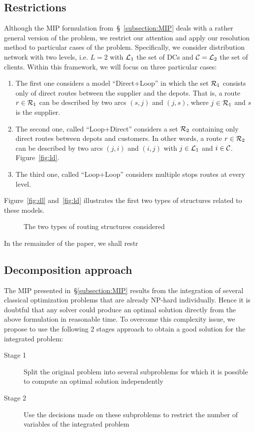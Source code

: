 \documentclass[a4paper,10pt]{article}
\begin{document}
\begin{linenumbers}
\subsection{Restrictions}
Although the MIP formulation from~\S~\ref{subsection:MIP} deals with a rather general version of the problem, we restrict our attention and apply our resolution method to particular cases of the problem.
Specifically, we consider distribution network with two levels, i.e. $L=2$ with $\mathcal{L}_1$ the set of DCs and $\mathcal{C}=\mathcal{L}_2$ the set of clients.
Within this framework, we will focus on three particular cases:
\begin{enumerate}
    \item The first one considers a model ``Direct+Loop'' in which the set $\mathcal{R}_1$ consists only of direct routes between the supplier and the depots. 
        That is, a route $r\in\mathcal{R}_1$ can be described by two arcs $(s,j)$ and $(j,s)$, where $j\in\mathcal{R}_1$ and $s$ is the supplier.
    \item The second one, called ``Loop+Direct'' considers a set $\mathcal{R}_2$ containing only direct routes between depots and customers. 
        In other words, a route $r\in\mathcal{R}_2$ can be described by two arcs $(j,i)$ and $(i,j)$ with $j\in\mathcal{L}_1$ and $i\in\mathcal{C}$. Figure~\ref{fig:ld}.
    \item The third one, called ``Loop+Loop'' considers multiple stops routes at every level.
\end{enumerate}
Figure~\ref{fig:dl} and~\ref{fig:ld} illustrates the first two types of structures related to these models.

\begin{figure}[htbp]
    \centering
    \caption{The two types of routing structures considered}
\end{figure}

In the remainder of the paper, we shall restr
\subsection{Decomposition approach}
The MIP presented in~\S\ref{subsection:MIP} results from the integration of several classical optimization problems that are already NP-hard individually. 
Hence it is doubtful that any solver could produce an optimal solution directly from the above formulation in reasonable time.
To overcome this complexity issue, we propose to use the following 2 stages approach to obtain a good solution for the integrated problem: 
\begin{description}
    \item[Stage 1] Split the original problem into several subproblems for which it is possible to compute an optimal solution independently
    \item[Stage 2] Use the decisions made on these subproblems to restrict the number of variables of the integrated problem 
\end{description}


\end{linenumbers}
\end{document}
